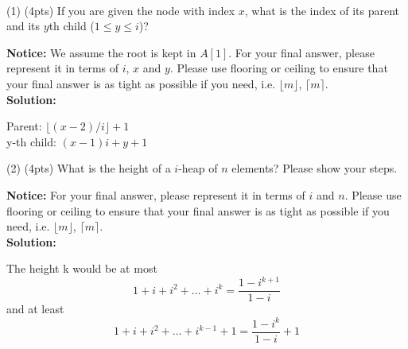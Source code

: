 \documentclass[10.5pt]{article}
\begin{document}
\begin{minipage}{1\textwidth}
    \centering
\end{minipage}%

~\\

(1) (4pts) If you are given the node with index $x$, what is the index of its parent and its $y$th child ($1 \leq y \leq i$)?

\textbf{Notice: }We assume the root is kept in $A[1]$. For your final answer, please represent it in terms of $i$, $x$ and $y$. Please use flooring or ceiling to ensure that your final answer is as tight as possible if you need, i.e. $\lfloor m \rfloor$, $\lceil m \rceil$.
~\\

\textbf{Solution:}

Parent: $\lfloor (x-2)/i\rfloor+1$\\
y-th child: $(x-1)i+y+1$

\newpage
(2) (4pts) What is the height of a $i$-heap of $n$ elements? Please show your steps.

\textbf{Notice: }For your final answer, please represent it in terms of $i$ and $n$. Please use flooring or ceiling to ensure that your final answer is as tight as possible if you need, i.e. $\lfloor m \rfloor$, $\lceil m \rceil$.
~\\

\textbf{Solution:}

The height k would be at most $$1+i+i^2+\dots+i^k=\frac{1-i^{k+1}}{1-i}$$
and at least $$1+i+i^2+\dots+i^{k-1}+1=\frac{1-i^{k}}{1-i}+1$$
\end{document}

